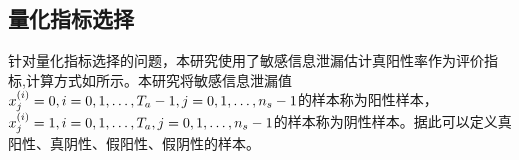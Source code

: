 {%
%	
%	
%	
%	
	\subsection{量化指标选择}
	
	针对量化指标选择的问题，本研究使用了敏感信息泄漏估计真阳性率作为评价指标,计算方式如所示。本研究将敏感信息泄漏值$x^{(i)}_j=0,i=0,1,\dots,T_a-1,j=0,1,\dots,n_s-1$的样本称为阳性样本，$x^{(i)}_j=1,i=0,1,\dots,T_a,j=0,1,\dots,n_s-1$的样本称为阴性样本。据此可以定义真阳性、真阴性、假阳性、假阴性的样本。
	
}
